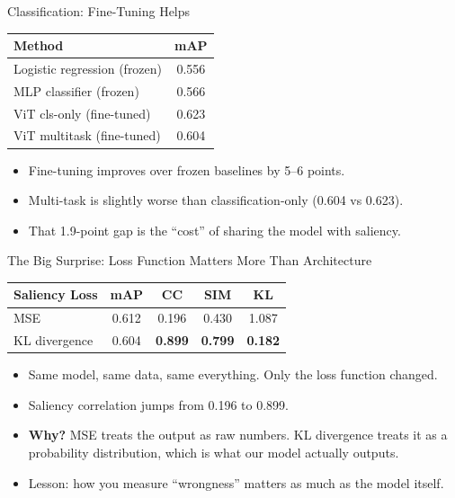 \documentclass{beamer}
\begin{document}
\begin{frame}{Classification: Fine-Tuning Helps}
\begin{center}
\begin{tabular}{lc}
\toprule
Method & mAP \\
\midrule
Logistic regression (frozen) & 0.556 \\
MLP classifier (frozen) & 0.566 \\
\midrule
ViT cls-only (fine-tuned) & 0.623 \\
ViT multitask (fine-tuned) & 0.604 \\
\bottomrule
\end{tabular}
\end{center}
\vfill
\begin{itemize}
  \item Fine-tuning improves over frozen baselines by 5--6 points.
  \item Multi-task is slightly worse than classification-only (0.604 vs 0.623).
  \item That 1.9-point gap is the ``cost'' of sharing the model with saliency.
\end{itemize}
\end{frame}

\begin{frame}{The Big Surprise: Loss Function Matters More Than Architecture}
\begin{center}
\begin{tabular}{lcccc}
\toprule
Saliency Loss & mAP & CC & SIM & KL \\
\midrule
MSE & 0.612 & 0.196 & 0.430 & 1.087 \\
KL divergence & 0.604 & \textbf{0.899} & \textbf{0.799} & \textbf{0.182} \\
\bottomrule
\end{tabular}
\end{center}
\vfill
\begin{itemize}
  \item Same model, same data, same everything. Only the loss function changed.
  \item Saliency correlation jumps from 0.196 to 0.899.
  \item \textbf{Why?} MSE treats the output as raw numbers. KL divergence treats it as a probability distribution, which is what our model actually outputs.
  \item Lesson: how you measure ``wrongness'' matters as much as the model itself.
\end{itemize}
\end{frame}
\end{document}
